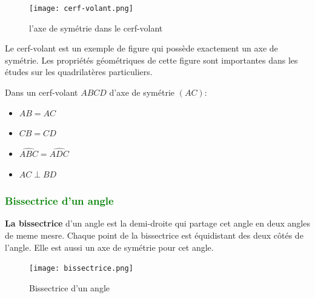 \documentclass{article}
\begin{document}
\begin{figure}[H]
    \centering
    \texttt{[image: cerf-volant.png]}
    \caption{l'axe de symétrie dans le cerf-volant}
    \label{fig:enter-label}
\end{figure}

\vspace{0.2cm}

Le cerf-volant est un exemple de figure qui possède exactement un axe de symétrie. Les propriétés géométriques de cette figure sont importantes dans les études sur les quadrilatères particuliers.

\vspace{0.2cm}

\begin{tcolorbox}[colback=red!10!white, colframe=red!75!black, title=\textcolor{white}{Définition : Bissectrice}, sharp corners=south]
Dans un cerf-volant \( ABCD \) d'axe de symétrie \( (AC) \):
\begin{itemize}
    \item \( AB = AC \)
    \item \( CB = CD \)
    \item \( \widehat{ABC} = \widehat{ADC} \)
    \item \( AC \perp BD \)
\end{itemize}
\end{tcolorbox}

\subsubsection{\textcolor{green}{Bissectrice d'un angle}}

\vspace{0.2cm}

\begin{tcolorbox}[colback=red!10!white, colframe=red!75!black, title=\textcolor{white}{Définition : }, sharp corners=south]
    \textbf{La bissectrice} d'un angle est la demi-droite qui partage cet angle en deux angles de meme mesre. Chaque point de la bissectrice est équidistant des deux côtés de l'angle. Elle est aussi un axe de symétrie pour cet angle.
\end{tcolorbox}

\vspace{0.2cm}

\begin{figure}[H]
    \centering
    \texttt{[image: bissectrice.png]}
    \caption{Bissectrice d'un angle}
    \label{fig:enter-label}
\end{figure}
\end{document}
